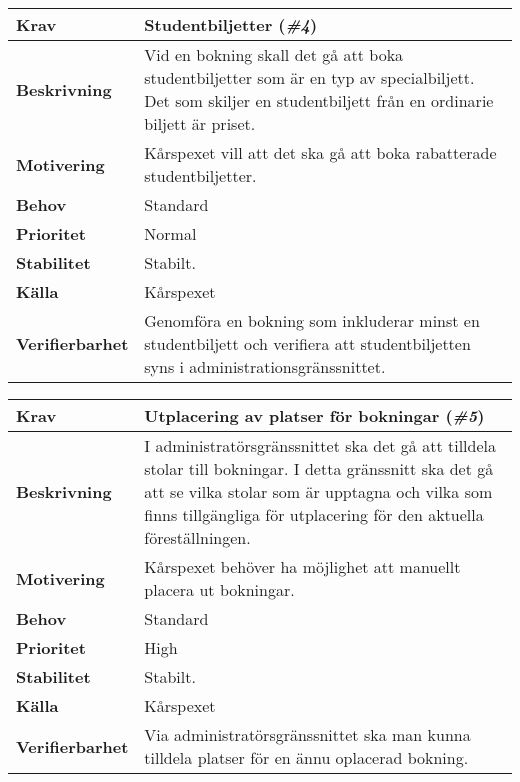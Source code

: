 \documentclass[a4paper, twoside, 11pt, titlepage]{article}
\begin{document}
	\begin{tabular} { p{2.6cm} p{12.5cm} }
		\hline
		\sffamily\textbf{Krav} & Studentbiljetter (\emph{\#4})  \\
		\hline
		\sffamily\textbf{Beskrivning} & Vid en bokning skall det gå att boka studentbiljetter som är en typ av specialbiljett. Det som skiljer en studentbiljett från en ordinarie biljett är priset.  \\
		\hline
		\sffamily\textbf{Motivering} & Kårspexet vill att det ska gå att boka rabatterade studentbiljetter.  \\
		\hline
		\sffamily\textbf{Behov} & Standard  \\
		\hline
		\sffamily\textbf{Prioritet} & Normal  \\
		\hline
		\sffamily\textbf{Stabilitet} & Stabilt.  \\
		\hline
		\sffamily\textbf{Källa} & Kårspexet  \\
		\hline
		\sffamily\textbf{Verifierbarhet} & Genomföra en bokning som inkluderar minst en studentbiljett och verifiera att studentbiljetten syns i administrationsgränssnittet.  \\
		\hline
	\end{tabular}
	\vspace{6mm}

	\begin{tabular} { p{2.6cm} p{12.5cm} }
		\hline
		\sffamily\textbf{Krav} & Utplacering av platser för bokningar (\emph{\#5})  \\
		\hline
		\sffamily\textbf{Beskrivning} & I administratörsgränssnittet ska det gå att tilldela stolar till bokningar. I detta gränssnitt ska det gå att se vilka stolar som är upptagna och vilka som finns tillgängliga för utplacering för den aktuella föreställningen.  \\
		\hline
		\sffamily\textbf{Motivering} & Kårspexet behöver ha möjlighet att manuellt placera ut bokningar.  \\
		\hline
		\sffamily\textbf{Behov} & Standard  \\
		\hline
		\sffamily\textbf{Prioritet} & High  \\
		\hline
		\sffamily\textbf{Stabilitet} & Stabilt.  \\
		\hline
		\sffamily\textbf{Källa} & Kårspexet  \\
		\hline
		\sffamily\textbf{Verifierbarhet} & Via administratörsgränssnittet ska man kunna tilldela platser för en ännu oplacerad bokning.  \\
		\hline
	\end{tabular}
	\vspace{6mm}
\end{document}
